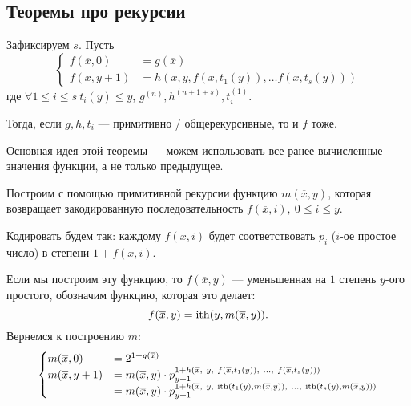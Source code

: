 \subsection{Теоремы про рекурсии}
\begin{thm}
    Зафиксируем $ s$. Пусть 
	\[
	\begin{cases}
		f(\overline{x}, 0) &= g(\overline{x}) \\
		f(\overline{x}, y+1) &= h(\overline{x}, y, f(\overline{x}, t_1(y)), \ldots f(\overline{x}, t_{s}(y)))
	\end{cases}
	\] 
	где $ \forall 1 \le i \le s ~t_i(y) \le y$, $ g^{(n)}, h^{(n+1+s)}, t_i^{(1)}$.

	\noindent
	Тогда, если $ g, h, t_i$ --- примитивно / общерекурсивные, то и $ f$ тоже.
\end{thm}
Основная идея этой теоремы --- можем использовать все ранее вычисленные значения функции, а не только предыдущее.
\begin{proof*}
	Построим с помощью примитивной рекурсии функцию $ m(\overline{x}, y)$, которая возвращает закодированную последовательность $ f(\overline{x}, i), ~ 0 \le i \le y$.

	Кодировать будем так: каждому $ f(\overline{x}, i)$ будет соответствовать $ p_i$ ($ i$-ое простое число) в степени $ 1 + f(\overline{x}, i)$. 

	Если мы построим эту функцию, то $ f(\overline{x}, y)$ --- уменьшенная на $ 1$ степень $ y$-ого простого, обозначим функцию, которая это делает:
	\[
		f(\overline{x}, y) = \operatorname{ith}(y, m(\overline{x}, y))
	.\] 
	Вернемся к построению $ m$:
	\[
	\begin{cases}
		m(\overline{x}, 0) &= 2^{1+g(\overline{x})} \\
		m(\overline{x}, y+1) &= m(\overline{x}, y) \cdot p_{y+1}^{1 + h\left(\overline{x}, ~y, ~f(\overline{x}, t_1(y)), ~\ldots, ~f(\overline{x}, t_s(y))\right)} \\
		&= m(\overline{x}, y) \cdot p_{y+1}^{1+h\left( 
			\overline{x}, ~y, ~\operatorname{ith}(t_1(y), m(\overline{x}, y)), ~\ldots, ~ \operatorname{ith}(t_{s}(y), m(\overline{x}, y))
	\right)
}
	\end{cases}
	\] 
\end{proof*}


